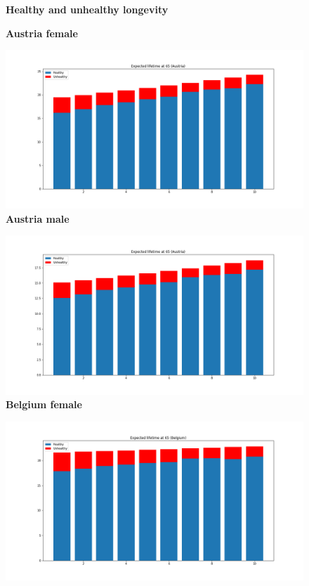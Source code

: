 \begin{figure}[H]
\centering \textbf{Healthy and unhealthy longevity}\par\medskip\medskip\bigskip
{}
\centering \textbf{Austria female}\par\medskip
  \includegraphics[width=\linewidth]{images/new_results/Austria_1_f.png}
 \endminipage\hfill
{}
\centering \textbf{Austria male}\par\medskip
  \includegraphics[width=\linewidth]{images/new_results/Austria_1_m.png}
\endminipage\hfill
{}
\centering \textbf{Belgium female}\par\medskip
  \includegraphics[width=\linewidth]{images/new_results/Belgium_1_f.png}

\end{figure}
